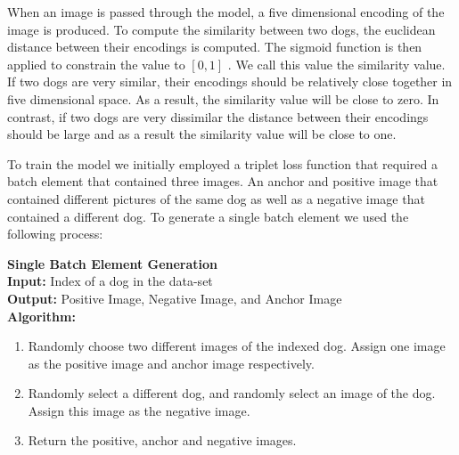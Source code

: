 \documentclass{article}
\begin{document}
\noindent When an image is passed through the model, a five dimensional encoding of the image is produced.  To compute the similarity between two dogs, the euclidean distance between their encodings is computed.  The sigmoid function is then applied to constrain the value to $[0,1]$ .  We call this value the similarity value.  If two dogs are very similar, their encodings should be relatively close together in five dimensional space.  As a result, the similarity value will be close to zero.  In contrast, if two dogs are very dissimilar the distance between their encodings should be large and as a result the similarity value will be close to one.  

To train the model we initially employed a triplet loss function that required a batch element that contained three images.  An anchor and positive image that contained different pictures of the same dog as well as a negative image that contained a different dog.  To generate a single batch element we used the following process: \\


    \begin{minipage}{1\textwidth}%
     \noindent \textbf{Single Batch Element Generation}  \\
    
      \noindent \textbf{Input:} Index of a dog in the data-set \\
      
      \noindent \textbf{Output:} Positive Image, Negative Image, and Anchor Image \\
      
      \noindent \textbf{Algorithm:} \\
    \end{minipage}%
    
    \begin{enumerate}
    
      \item Randomly choose two different images of the indexed dog.  Assign one image as the positive image and anchor image respectively. 
    
      \item Randomly select a different dog, and randomly select an image of the dog.  Assign this image as the negative image.
      
      \item Return the positive, anchor and negative images.
    
    \end{enumerate}
\end{document}
